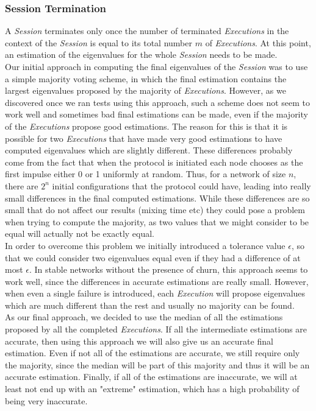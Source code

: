 \documentclass[a4paper,11pt,twoside]{report}
\begin{document}
\subsubsection*{Session Termination}

A \textit{Session} terminates only once the number of terminated \textit{Executions} in the context of the \textit{Session} is equal to its total number $m$ of \textit{Executions}. At this point, an estimation of the eigenvalues for the whole \textit{Session} needs to be made.\\ 

Our initial approach in computing the final eigenvalues of the \textit{Session} was to use a simple majority voting scheme, in which the final estimation contains the largest eigenvalues proposed by the majority of \textit{Executions}. However, as we discovered once we ran tests using this approach, such a scheme does not seem to work well and sometimes bad final estimations can be made, even if the majority of the \textit{Executions} propose good estimations. The reason for this is that it is possible for two \textit{Executions} that have made very good estimations to have computed eigenvalues which are slightly different. These differences probably come from the fact that when the protocol is initiated each node chooses as the first impulse either 0 or 1 uniformly at random. Thus, for a network of size $n$, there are $2^n$ initial configurations that the protocol could have, leading into really small differences in the final computed estimations. While these differences are so small that do not affect our results (mixing time etc) they could pose a problem when trying to compute the majority, as two values that we might consider to be equal will actually not be exactly equal. \\

In order to overcome this problem we initially introduced a tolerance value $\epsilon$, so that we could consider two eigenvalues equal even if they had a difference of at most $\epsilon$. In stable networks without the presence of churn, this approach seems to work well, since the differences in accurate estimations are really small. However, when even a single failure is introduced, each \textit{Execution} will propose eigenvalues which are much different than the rest and usually no majority can be found.\\ 

As our final approach, we decided to use the median of all the estimations proposed by all the completed \textit{Executions}. If all the intermediate estimations are accurate, then using this approach we will also give us an accurate final estimation. Even if not all of the estimations are accurate, we still require only the majority, since the median will be part of this majority and thus it will be an accurate estimation. Finally, if all of the estimations are inaccurate, we will at least not end up with an "extreme" estimation, which has a high probability of being very inaccurate.
\end{document}
